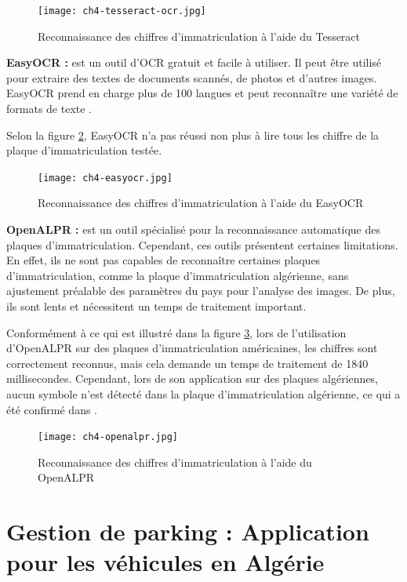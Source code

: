 \begin{figure}[H]
	\centering
	\texttt{[image: ch4-tesseract-ocr.jpg]}
	\caption{Reconnaissance des chiffres d'immatriculation à l'aide du Tesseract}
    \label{fig:ch4-tesseract-ocr}
\end{figure}
\textbf{EasyOCR : } est un outil d'OCR gratuit et facile à utiliser. Il peut être utilisé pour extraire des textes de documents scannés, de photos et d'autres images. EasyOCR prend en charge plus de 100 langues et peut reconnaître une variété de formats de texte \cite{ch4_EasyOCRV83}.

Selon la figure \ref{fig:ch4-easyocr}, EasyOCR n'a pas réussi non plus à lire tous les  chiffre de la plaque d'immatriculation testée.

\begin{figure}[H]
	\centering
	\texttt{[image: ch4-easyocr.jpg]}
	\caption{Reconnaissance des chiffres d'immatriculation à l'aide du EasyOCR}
    \label{fig:ch4-easyocr}
\end{figure}

\textbf{OpenALPR :} est un outil spécialisé pour la reconnaissance automatique des plaques d'immatriculation. 
Cependant, ces outils présentent certaines limitations. En effet, ils ne sont pas capables de reconnaître certaines plaques d'immatriculation, comme la plaque d'immatriculation algérienne, sans ajustement préalable des paramètres du pays pour l'analyse des images. De plus, ils sont lents et nécessitent un temps de traitement important.

Conformément à ce qui est illustré dans la figure \ref{fig:ch4-openalpr}, lors de l'utilisation d'OpenALPR sur des plaques d'immatriculation américaines, les chiffres sont correctement reconnus, mais cela demande un temps de traitement de 1840 millisecondes. Cependant, lors de son application sur des plaques algériennes, aucun symbole n'est détecté dans la plaque d'immatriculation algérienne, ce qui a été confirmé dans \cite{ch4_OpenALPR81}.
 
\begin{figure}[H]
	\centering
	\texttt{[image: ch4-openalpr.jpg]}
	\caption{Reconnaissance des chiffres d'immatriculation à l'aide du OpenALPR}
    \label{fig:ch4-openalpr}
\end{figure}

\section{Gestion de parking : Application pour les véhicules en Algérie}

